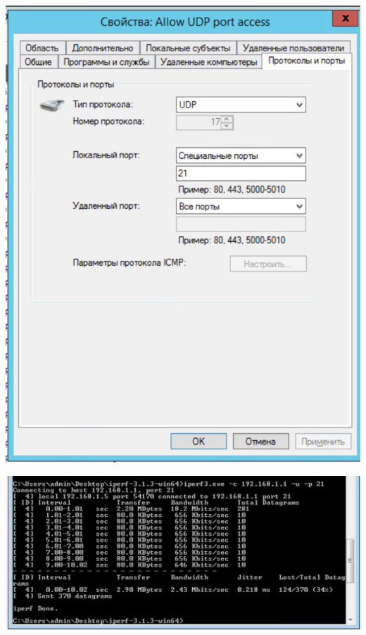 \documentclass[a4paper,14pt]{extarticle}
\begin{document}
    \begin{center}
        \includegraphics[scale=0.7]{8.3.2.png}
    \end{center}

    \begin{center}
        \includegraphics[scale=0.8]{8.3.3.png}
    \end{center}
\end{document}
